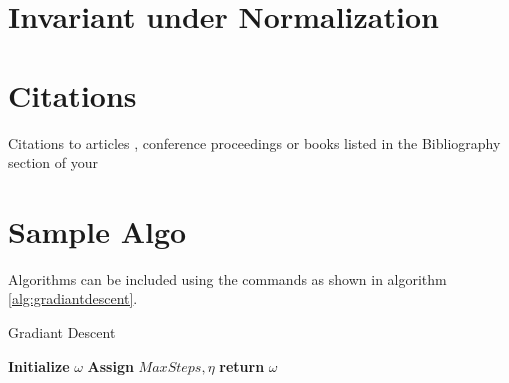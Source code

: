 \documentclass{sig-alternate}
\begin{document}
\section{Invariant under Normalization}
\section{Citations}
    Citations to articles \cite{bowman:reasoning,
    clark:pct, braams:babel, herlihy:methodology},
    conference proceedings \cite{clark:pct} or
    books \cite{salas:calculus, Lamport:LaTeX} listed
    in the Bibliography section of your

 

\section{Sample Algo}
Algorithms can be included using the commands as shown in algorithm \ref{alg:gradiantdescent}.

    \begin{algorithm}
        \caption{Gradiant Descent}\label{alg:gradiantdescent}
        \begin {algorithmic}[1]
            \STATE \textbf{Initialize} $\omega$
            \STATE \textbf{Assign} $MaxSteps, \eta$
            \ENDWHILE
            \STATE \textbf{return} $\omega$
        \end{algorithmic}
    \end{algorithm}
    
\end{document}
